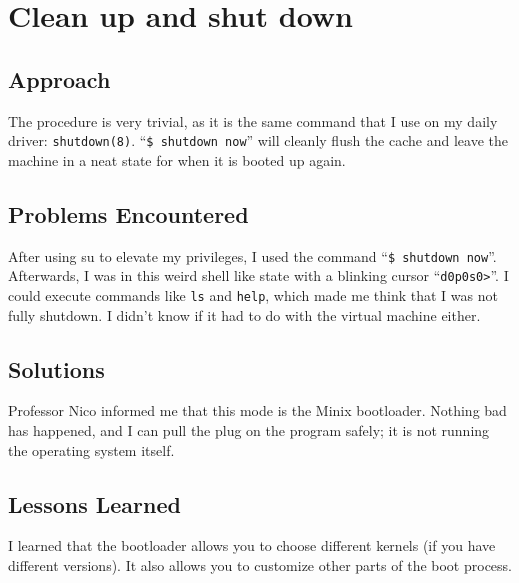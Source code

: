 \documentclass[11pt]{article}
\begin{document}
\section{Clean up and shut down}
\subsection{Approach}
The procedure is very trivial, as it is the same command that I use on my daily driver: {\tt shutdown(8)}. ``{\tt \$ shutdown now}'' will cleanly flush the cache and leave the machine in a neat state for when it is booted up again.

\subsection{Problems Encountered}
After using su to elevate my privileges, I used the command ``{\tt \$ shutdown now}''. Afterwards, I was in this weird shell like state with a blinking cursor ``{\tt d0p0s0>}''. I could execute commands like {\tt ls} and {\tt help}, which made me think that I was not fully shutdown. I didn't know if it had to do with the virtual machine either.

\subsection{Solutions}
Professor Nico informed me that this mode is the {\sc Minix} bootloader. Nothing bad has happened, and I can pull the plug on the program safely; it is not running the operating system itself.

\subsection{Lessons Learned}
I learned that the bootloader allows you to choose different kernels (if you have different versions). It also allows you to customize other parts of the boot process.
\end{document}

